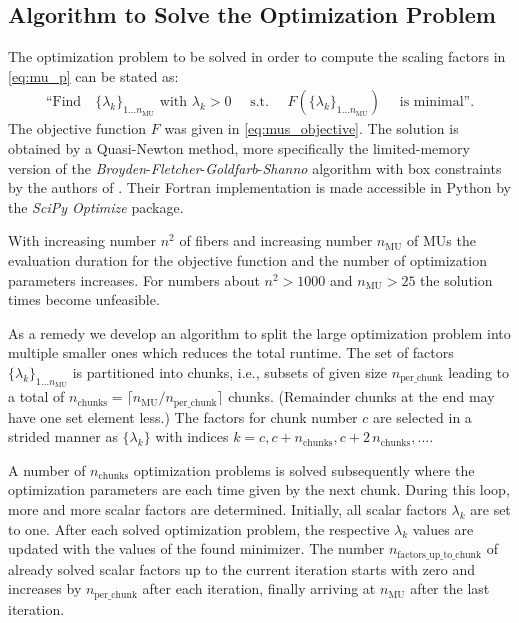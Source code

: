 \subsection{Algorithm to Solve the Optimization Problem}
The optimization problem to be solved in order to compute the scaling factors in \cref{eq:mu_p} can be stated as:
\begin{align}\label{eq:mus_opt}
  \text{``Find}\quad \{\lambda_k\}_{1\dots n_\text{MU}} \text{ with } \lambda_k > 0 \quad \text{ s.t. } \quad F(\{\lambda_k\}_{1\dots n_\text{MU}}) \quad \text{ is minimal''.}
\end{align}
The objective function $F$ was given in \cref{eq:mus_objective}. The solution is obtained by a Quasi-Newton method, more specifically the limited-memory version of the \emph{Broyden}-\emph{Fletcher}-\emph{Goldfarb}-\emph{Shanno} algorithm with box constraints by the authors of \cite{byrd1995limited}. Their Fortran implementation is made accessible in Python by the \emph{SciPy Optimize} package.

With increasing number $n^2$ of fibers and increasing number $n_\text{MU}$ of MUs the evaluation duration for the objective function and the number of optimization parameters increases. For numbers about $n^2 > 1000$ and $n_\text{MU} > 25$ the solution times become unfeasible.

As a remedy we develop an algorithm to split the large optimization problem into multiple smaller ones which reduces the total runtime. 
The set of factors $\{\lambda_k\}_{1\dots n_\text{MU}}$ is partitioned into chunks, i.e., subsets of given size $n_\text{per\_chunk}$ leading to a total of $n_\text{chunks} = \lceil n_\text{MU} / n_\text{per\_chunk} \rceil$ chunks.
(Remainder chunks at the end may have one set element less.)
The factors for chunk number $c$ are selected in a strided manner as $\{\lambda_k\}$ with indices ${k=c, c+n_\text{chunks}, c+2\,n_\text{chunks}, \dots}$.

A number of $n_\text{chunks}$ optimization problems is solved subsequently where the optimization parameters are each time given by the next chunk. During this loop, more and more scalar factors are determined.
Initially, all scalar factors $\lambda_k$ are set to one. 
After each solved optimization problem, the respective $\lambda_k$ values are updated with the values of the found minimizer.
The number $n_\text{factors\_up\_to\_chunk}$ of already solved scalar factors up to the current iteration starts with zero and increases by $n_\text{per\_chunk}$ after each iteration, finally arriving at $n_\text{MU}$ after the last iteration.

